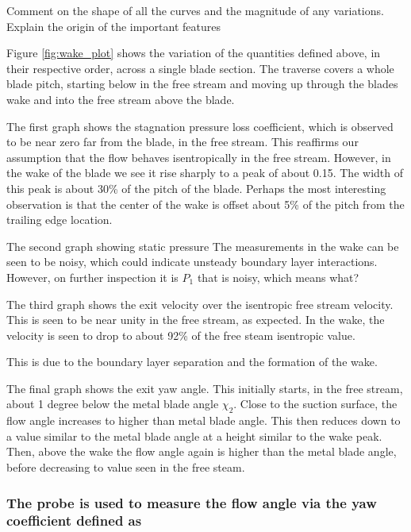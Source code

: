 \documentclass{article}
\begin{document}
Comment on the shape of all the curves and the magnitude of any variations. Explain the origin
of the important features

Figure \ref{fig:wake_plot} shows the variation of the quantities defined above, in their respective order, across a single blade section.
The traverse covers a whole blade pitch, starting below in the free stream and moving up through the blades wake and into the free stream above the blade.

The first graph shows the stagnation pressure loss coefficient, which is observed to be near zero far from the blade, in the free stream.
This reaffirms our assumption that the flow behaves isentropically in the free stream.
However, in the wake of the blade we see it rise sharply to a peak of about 0.15.
The width of this peak is about 30\% of the pitch of the blade.
Perhaps the most interesting observation is that the center of the wake is offset about 5\% of the pitch from the trailing edge location.

The second graph showing static pressure 
The measurements in the wake can be seen to be noisy, which could indicate unsteady boundary layer interactions.
However, on further inspection it is $P_1$ that is noisy, which means what? %

The third graph shows the exit velocity over the isentropic free stream velocity.
This is seen to be near unity in the free stream, as expected.
In the wake, the velocity is seen to drop to about 92\% of the free steam isentropic value.

This is due to the boundary layer separation and the formation of the wake.

The final graph shows the exit yaw angle.
This initially starts, in the free stream, about 1 degree below the metal blade angle $\chi_2$.
Close to the suction surface, the flow angle increases to higher than metal blade angle.
This then reduces down to a value similar to the metal blade angle at a height similar to the wake peak.
Then, above the wake the flow angle again is higher than the metal blade angle, before decreasing to value seen in the free steam.


\subsubsection{The probe is used to measure the flow angle via the yaw coefficient defined as
}
\end{document}
